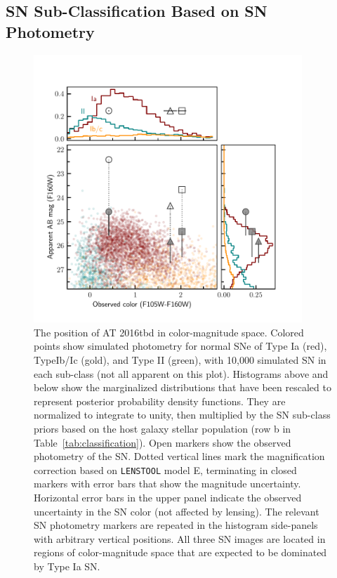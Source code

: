 \documentclass[12pt]{article}
\def\SNABC{AT 2016tbd\xspace}
\def\lenstool{{\tt LENSTOOL}\xspace}
\begin{document}
{\subsection*{SN Sub-Classification Based on SN Photometry}

\begin{figure}
    \centering
    \includegraphics[width=0.9\textwidth]{Paper/Figures/colormag_classification_supplement.pdf}
    \caption{The position of \SNABC in color-magnitude space.
    Colored points show simulated photometry for normal SNe of Type Ia (red), TypeIb/Ic (gold), and Type II (green), with 10,000 simulated SN in each sub-class (not all apparent on this plot).  Histograms above and below show the marginalized distributions that have been rescaled to represent posterior probability density functions. They are normalized to integrate to unity, then multiplied by the SN sub-class priors based on the host galaxy stellar population (row b in Table~\ref{tab:classification}).  Open markers show the observed photometry of the SN. Dotted vertical lines mark the magnification correction based on \lenstool model E, terminating in closed markers with error bars that show the magnitude uncertainty.  Horizontal error bars in the upper panel indicate the observed uncertainty in 
    the SN color (not affected by lensing).  The relevant SN photometry markers are repeated in the histogram side-panels with arbitrary vertical positions.  All three SN images are located in regions of color-magnitude space that are expected to be dominated by Type Ia SN.}
    \label{fig:colormag_classification_supplement}
\end{figure}

}
\end{document}
